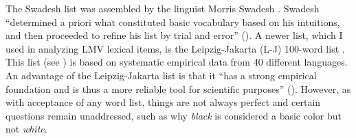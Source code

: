 \documentclass[output=paper]{LSP/langsci}
\begin{document}
	The Swadesh list was assembled by the linguist Morris Swadesh \citep{Swadesh1971}. Swadesh “determined a priori what constituted basic vocabulary based on his intuitions, and then proceeded to refine his list by trial and error” (\citealt[230]{Tadmoretal2010}). A newer list, which I used in analyzing LMV lexical items, is the Leipzig-Jakarta (L-J) 100-word list \citep{HaspelmathTadmor2009}. This list (see ) is based on systematic empirical data from 40 different languages. An advantage of the Leipzig-Jakarta list is that it ``has a strong empirical foundation and is thus a more reliable tool for scientific purposes” (\citealt[230]{Tadmoretal2010}). However, as with acceptance of any word list, things are not always perfect and certain questions remain unaddressed, such as why \emph{black} is considered a basic color but not \emph{white}.
\end{document}

